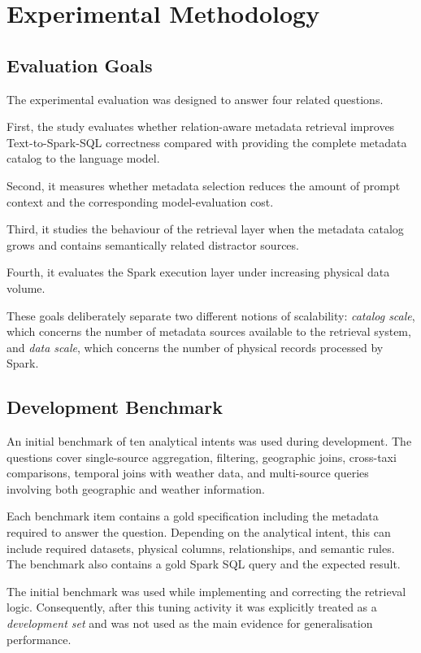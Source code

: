 \section{Experimental Methodology}
\label{sec:methodology}

\subsection{Evaluation Goals}

The experimental evaluation was designed to answer four related questions.

First, the study evaluates whether relation-aware metadata retrieval improves
Text-to-Spark-SQL correctness compared with providing the complete metadata
catalog to the language model.

Second, it measures whether metadata selection reduces the amount of prompt
context and the corresponding model-evaluation cost.

Third, it studies the behaviour of the retrieval layer when the metadata
catalog grows and contains semantically related distractor sources.

Fourth, it evaluates the Spark execution layer under increasing physical data
volume.

These goals deliberately separate two different notions of scalability:
\emph{catalog scale}, which concerns the number of metadata sources available
to the retrieval system, and \emph{data scale}, which concerns the number of
physical records processed by Spark.


\subsection{Development Benchmark}

An initial benchmark of ten analytical intents was used during development.
The questions cover single-source aggregation, filtering, geographic joins,
cross-taxi comparisons, temporal joins with weather data, and multi-source
queries involving both geographic and weather information.

Each benchmark item contains a gold specification including the metadata
required to answer the question. Depending on the analytical intent, this can
include required datasets, physical columns, relationships, and semantic
rules. The benchmark also contains a gold Spark SQL query and the expected
result.

The initial benchmark was used while implementing and correcting the
retrieval logic. Consequently, after this tuning activity it was explicitly
treated as a \emph{development set} and was not used as the main evidence for
generalisation performance.

